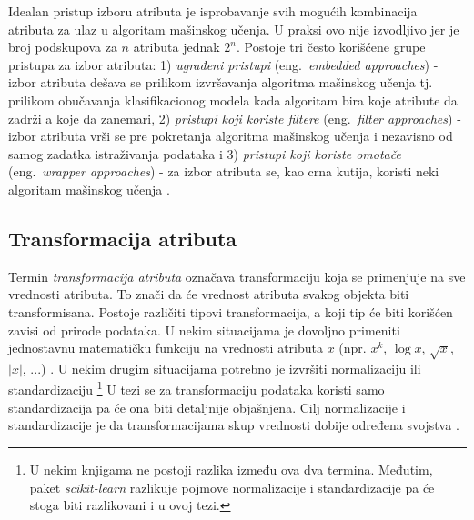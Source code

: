 \documentclass[12pt,oneside]{memoir}
\begin{document}
Idealan pristup izboru atributa je isprobavanje svih mogućih kombinacija atributa za ulaz u algoritam mašinskog učenja. U praksi ovo nije izvodljivo jer je broj podskupova za $n$ atributa jednak $2^n$. Postoje tri često korišćene grupe pristupa za izbor atributa: 1) \textit{ugrađeni pristupi} (eng.~\textit{embedded approaches}) - izbor atributa dešava se prilikom izvršavanja algoritma mašinskog učenja tj. prilikom obučavanja klasifikacionog modela kada algoritam bira koje atribute da zadrži a koje da zanemari, 2) \textit{pristupi koji koriste filtere} (eng.~\textit{filter approaches}) - izbor atributa vrši se pre pokretanja algoritma mašinskog učenja i nezavisno od samog zadatka istraživanja podataka i 3) \textit{pristupi koji koriste omotače} (eng.~\textit{wrapper approaches}) - za izbor atributa se, kao crna kutija, koristi neki algoritam mašinskog učenja \cite{mitic, UMLFTA, aggarwal}.

\subsection{Transformacija atributa}

Termin \textit{transformacija atributa} označava transformaciju koja se primenjuje na sve vrednosti atributa. To znači da će vrednost atributa svakog objekta biti transformisana. Postoje različiti tipovi transformacija, a koji tip će biti korišćen zavisi od prirode podataka. U nekim situacijama je dovoljno primeniti jednostavnu matematičku funkciju na vrednosti atributa $x$ (npr. $x^k$, $\log x$, $\sqrt{x}$, $\left| x \right|$, ...) . U nekim drugim situacijama potrebno je izvršiti normalizaciju ili standardizaciju \footnote{U nekim knjigama ne postoji razlika između ova dva termina. Međutim, paket \textit{scikit-learn} razlikuje pojmove normalizacije i standardizacije pa će stoga biti razlikovani i u ovoj tezi.} U tezi se za transformaciju podataka koristi samo standardizacija pa će ona biti detaljnije objašnjena. Cilj normalizacije i standardizacije je da transformacijama skup vrednosti dobije određena svojstva \cite{mitic}.  
\end{document}
